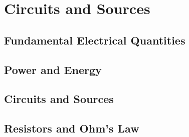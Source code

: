 \chapter{Circuits and Sources}
    \section{Fundamental Electrical Quantities}
    \section{Power and Energy}
    \section{Circuits and Sources}
    \section{Resistors and Ohm's Law}